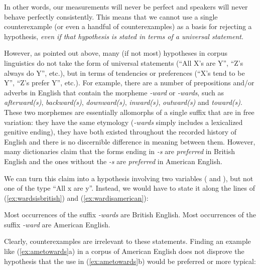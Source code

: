 In other words, our measurements  will never be perfect and speakers will never behave perfectly consistently. This means that we cannot use a single counterexample  (or even a handful of counterexamples) as a basis for rejecting a hypothesis,  \emph{even if that hypothesis is stated in terms of a universal statement}.

However, as pointed out above, many (if not most) hypotheses  in corpus linguistics do not take the form of universal statements (``All X's are Y'', ``Z's always do Y'', etc.), but in terms of tendencies or preferences (``X's tend to be Y'', ``Z's prefer Y'', etc.). For example, there are a number of prepositions  and\slash or adverbs  in English that contain the morpheme  \textit{-ward} or \textit{-wards}, such as \textit{afterward(s)}, \textit{backward(s)}, \textit{downward(s)}, \textit{inward(s)}, \textit{outward(s)} and \textit{toward(s)}. These two morphemes are essentially allomorphs of a single suffix  that are in free variation:  they have the same etymology (\textit{-wards} simply includes a lexicalized  genitive ending), they have both existed throughout the recorded history of English and there is no discernible difference in meaning  between them. However, many dictionaries  claim that the forms ending in \textit{-s} are \emph{preferred} in British  English and the ones without the \textit{-s} are \emph{preferred} in American  English.

We can turn this claim into a hypothesis  involving two variables (  and ), but not one of the type ``All x are y''. Instead, we would have to state it along the lines of (\ref{ex:wardsisbritish}) and (\ref{ex:wardisamerican}):

\begin{exe}
\ex Most occurrences of the suffix  \textit{-wards} are British  English.\label{ex:wardsisbritish}
\ex Most occurrences of the suffix  \textit{-ward} are American  English.\label{ex:wardisamerican}
\end{exe}

Clearly, counterexamples  are irrelevant to these statements. Finding an example like (\ref{ex:ametowards}a) in a corpus of American  English does not disprove the hypothesis  that the use in (\ref{ex:ametowards}b) would be preferred or more typical:

